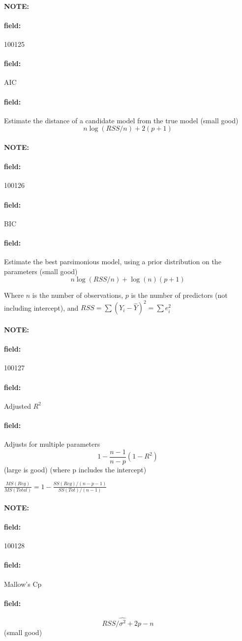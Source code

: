 \documentclass[12pt]{article}
\newenvironment{note}{\paragraph{NOTE:}}{}
\newenvironment{field}{\paragraph{field:}}{}
\begin{document}
\begin{note} \begin{field} \tiny 100125 \end{field}
 \begin{field}
  AIC
 \end{field}
 \begin{field}
  Estimate the distance of a candidate model from the true model (small good)
  $$ n \log (RSS/n) + 2(p+1)$$
 \end{field}
\end{note}


\begin{note} \begin{field} \tiny 100126 \end{field}
 \begin{field}
  BIC
 \end{field}
 \begin{field}
  Estimate the best parsimonious model, using a prior distribution on the parameters (small good)
  $$  n \log (RSS/n) + \log(n)(p+1)$$

  Where $n$ is the number of observations, $p$ is the number of predictors (not including intercept), and $RSS = \sum (Y_i - \hat{Y})^2 = \sum e_i^2 $
 \end{field}
\end{note}


\begin{note} \begin{field} \tiny 100127 \end{field}
 \begin{field}
  Adjusted $R^2$
 \end{field}
 \begin{field}
  Adjusts for multiple parameters
$$ 1 - \frac{n-1}{n-p}(1 - R^2)$$ (large is good)
(where p includes the intercept)

$\frac{MS(Reg)}{MS(Total)} = 1 - \frac{SS(Reg)/(n - p - 1)}{SS(Tot)/(n-1)}$
 \end{field}
\end{note}

\begin{note} \begin{field} \tiny 100128 \end{field}
 \begin{field}
  Mallow's Cp
 \end{field}
 \begin{field}
  $$ RSS/\hat{\sigma^2} + 2p - n $$ (small good)
 \end{field}
\end{note}
\end{document}
